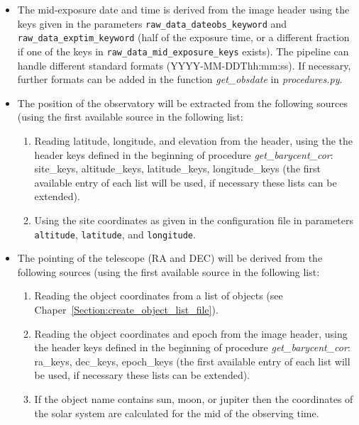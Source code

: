 \documentclass[10pt,a4paper]{article}
\begin{document}
\begin{itemize}
 \item The mid-exposure date and time is derived from the image header using the keys given in the parameters \verb|raw_data_dateobs_keyword| and \verb|raw_data_exptim_keyword| (half of the exposure time, or a different fraction if one of the keys in \verb|raw_data_mid_exposure_keys| exists). The pipeline can handle different standard formats (YYYY-MM-DDThh:mm:ss). If necessary, further formats can be added in the function \textit{get\_obsdate} in \textit{procedures.py}.
 \item The position of the observatory will be extracted from the following sources (using the first available source in the following list:
 \begin{enumerate}\setlength\itemsep{0em}
  \item Reading latitude, longitude, and elevation from the header, using the the header keys defined in the beginning of procedure \textit{get\_barycent\_cor}: site\_keys, altitude\_keys, latitude\_keys, longitude\_keys (the first available entry of each list will be used, if necessary these lists can be extended).
  \item Using the site coordinates as given in the configuration file in parameters \verb|altitude|, \verb|latitude|, and \verb|longitude|.
 \end{enumerate}
 \item The pointing of the telescope (RA and DEC) will be derived from the following sources (using the first available source in the following list:
 \begin{enumerate}\setlength\itemsep{0em}
  \item Reading the object coordinates from a list of objects (see Chaper~\ref{Section:create_object_list_file}).
  \item Reading the object coordinates and epoch from the image header, using the header keys defined in the beginning of procedure \textit{get\_barycent\_cor}: ra\_keys, dec\_keys, epoch\_keys (the first available entry of each list will be used, if necessary these lists can be extended).
  \item If the object name contains sun, moon, or jupiter then the coordinates of the solar system are calculated for the mid of the observing time.
 \end{enumerate}
\end{itemize}

\end{document}
